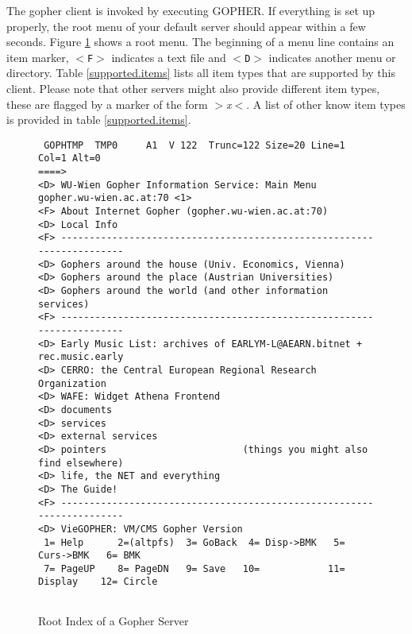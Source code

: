 



The gopher client is invoked by executing GOPHER.  If everything is set up
properly, the root menu of your default server should appear within a
few seconds.  Figure \ref{run.cl1} shows a root menu.  The beginning of
a menu line contains an item marker, {\tt $<$F$>$} indicates a text file
and {\tt $<$D$>$} indicates another menu or directory.
Table \ref{supported.items} lists all item types that are supported
by this client.  Please note that other servers might also provide
different item types, these are flagged by a marker of the form
{\tt $>$}{\sl{x}}{\tt{$<$}}.  A list of other know item types is provided
in table \ref{supported.items}.



\begin{figure}
\caption{Root Index of a Gopher Server}\label{run.cl1}
\rule{0mm}{2mm}
\begin{center}
\begin{small}
\begin{verbatim}
 GOPHTMP  TMP0     A1  V 122  Trunc=122 Size=20 Line=1 Col=1 Alt=0
====>
<D> WU-Wien Gopher Information Service: Main Menu
gopher.wu-wien.ac.at:70 <1>                                                  
<F> About Internet Gopher (gopher.wu-wien.ac.at:70)
<D> Local Info
<F> ----------------------------------------------------------------------
<D> Gophers around the house (Univ. Economics, Vienna)
<D> Gophers around the place (Austrian Universities)
<D> Gophers around the world (and other information services)
<F> ----------------------------------------------------------------------
<D> Early Music List: archives of EARLYM-L@AEARN.bitnet + rec.music.early
<D> CERRO: the Central European Regional Research Organization
<D> WAFE: Widget Athena Frontend
<D> documents
<D> services
<D> external services
<D> pointers                        (things you might also find elsewhere)
<D> life, the NET and everything
<D> The Guide!
<F> ----------------------------------------------------------------------
<D> VieGOPHER: VM/CMS Gopher Version
 1= Help      2=(altpfs)  3= GoBack  4= Disp->BMK   5= Curs->BMK   6= BMK  
 7= PageUP    8= PageDN   9= Save   10=            11= Display    12= Circle


\end{verbatim}
\end{small}
\end{center}
\rule{0mm}{2mm}
\end{figure}
 


